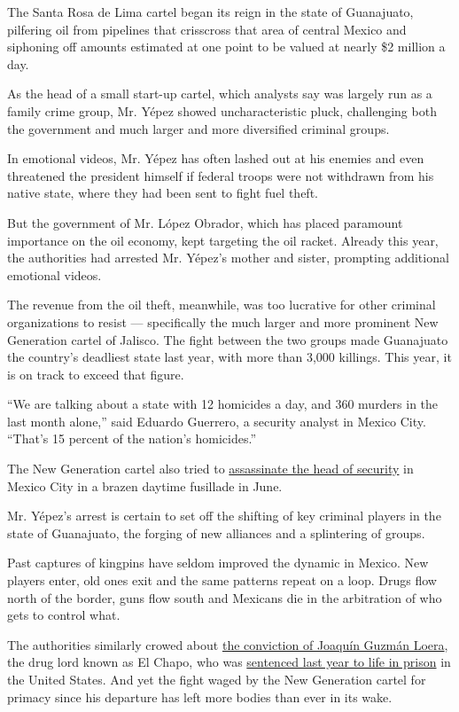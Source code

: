 The Santa Rosa de Lima cartel began its reign in the state of
Guanajuato, pilfering oil from pipelines that crisscross that area of
central Mexico and siphoning off amounts estimated at one point to be
valued at nearly \$2 million a day.

As the head of a small start-up cartel, which analysts say was largely
run as a family crime group, Mr. Yépez showed uncharacteristic pluck,
challenging both the government and much larger and more diversified
criminal groups.

In emotional videos, Mr. Yépez has often lashed out at his enemies and
even threatened the president himself if federal troops were not
withdrawn from his native state, where they had been sent to fight fuel
theft.

But the government of Mr. López Obrador, which has placed paramount
importance on the oil economy, kept targeting the oil racket. Already
this year, the authorities had arrested Mr. Yépez's mother and sister,
prompting additional emotional videos.

The revenue from the oil theft, meanwhile, was too lucrative for other
criminal organizations to resist --- specifically the much larger and
more prominent New Generation cartel of Jalisco. The fight between the
two groups made Guanajuato the country's deadliest state last year, with
more than 3,000 killings. This year, it is on track to exceed that
figure.

``We are talking about a state with 12 homicides a day, and 360 murders
in the last month alone,'' said Eduardo Guerrero, a security analyst in
Mexico City. ``That's 15 percent of the nation's homicides.''

The New Generation cartel also tried to
\href{https://www.nytimes3xbfgragh.onion/2020/06/26/world/americas/mexico-city-police-chief-shot.html}{assassinate
the head of security} in Mexico City in a brazen daytime fusillade in
June.

Mr. Yépez's arrest is certain to set off the shifting of key criminal
players in the state of Guanajuato, the forging of new alliances and a
splintering of groups.

Past captures of kingpins have seldom improved the dynamic in Mexico.
New players enter, old ones exit and the same patterns repeat on a loop.
Drugs flow north of the border, guns flow south and Mexicans die in the
arbitration of who gets to control what.

The authorities similarly crowed about
\href{https://www.nytimes3xbfgragh.onion/2019/02/12/nyregion/el-chapo-verdict.html}{the
conviction of Joaquín Guzmán Loera}, the drug lord known as El Chapo,
who was
\href{https://www.nytimes3xbfgragh.onion/2019/07/17/nyregion/el-chapo-sentencing.html}{sentenced
last year to life in prison} in the United States. And yet the fight
waged by the New Generation cartel for primacy since his departure has
left more bodies than ever in its wake.

